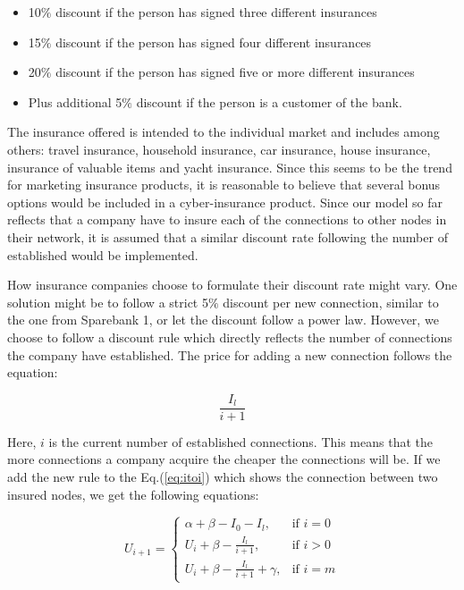 \begin{itemize}

\item 10$\%$ discount if the person has signed three different insurances
\item 15$\%$ discount if the person has signed four different insurances
\item 20$\%$ discount if the person has signed five or more different insurances
\item Plus additional 5$\%$ discount if the person is a customer of the bank. 

\end{itemize}

The insurance offered is intended to the individual market and includes among others: travel insurance, household insurance, car insurance, house insurance, insurance of valuable items and yacht insurance. Since this seems to be the trend for marketing insurance products, it is reasonable to believe that several bonus options would be included in a cyber-insurance product. Since our model so far reflects that a company have to insure each of the connections to other nodes in their network, it is assumed that a similar discount rate following the number of established would be implemented. 

How insurance companies choose to formulate their discount rate might vary. One solution might be to follow a strict 5$\%$ discount per new connection, similar to the one from Sparebank 1, or let the discount follow a power law. However, we choose to follow a discount rule which directly reflects the number of connections the company have established. 
The price for adding a new connection follows the equation:

\begin{equation}
\frac{I_{l}}{i+1}
\label{eq:discount0}
\end{equation}

Here, $i$ is the current number of established connections. This means that the more connections a company acquire the cheaper the connections will be. 
If we add the new rule to the Eq.(\ref{eq:itoi}) which shows the connection between two insured nodes, we get the following equations: 

\begin{equation}
    U_{i+1}= 
\begin{cases}
    \alpha + \beta - I_{0} - I_{l},& \text{if } i = 0\\
    U_{i}+\beta -\frac{I_{l}}{i+1},& \text{if }  i>0\\
    U_{i}+\beta -\frac{I_{l}}{i+1}+\gamma,& \text{if } i=m
    
\end{cases}
\label{eq:discount1}
\end{equation}


